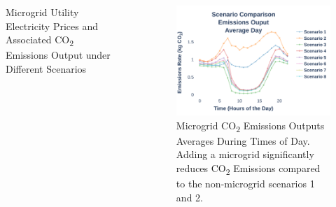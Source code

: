 \documentclass[final, 36 pt]{beamer}
\newlength{\sepwid}
\newlength{\onecolwid}
\newlength{\twocolwid}
\begin{document}
\begin{frame}[t]
\begin{columns}[t]
\begin{column}{\twocolwid}
\begin{block}{Microgrid Utility Electricity Prices and Associated CO\textsubscript{2} Emissions Output under Different Scenarios}
	\begin{table}
		\caption{}
		\centering
		\large
		
		\label{tab:emissions}
	\end{table}
\end{block}




%	



\end{column} %

\begin{column}{\sepwid}\end{column} %

\begin{column}{\onecolwid} %
	\begin{figure}
	\centering
	\includegraphics[width=\linewidth]{Fig/emissions_scenario_comparison_run_3_large_font}
	\caption{\large Microgrid CO\textsubscript{2} Emissions Outputs Averages During Times of Day. Adding a microgrid significantly reduces CO\textsubscript{2} Emissions compared to the non-microgrid scenarios 1 and 2.}
	\label{fig:emissionsscenariocomparison}
\end{figure}


\end{column}
\end{columns}
\end{frame}
\end{document}
